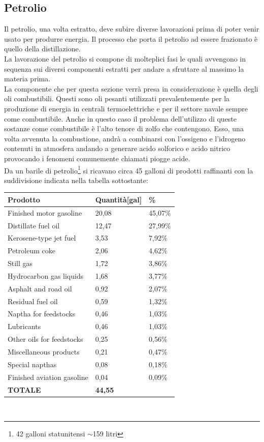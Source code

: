 \subsection{Petrolio}
Il petrolio, una volta estratto, deve subire diverse lavorazioni prima di poter venir usato per produrre energia. Il processo che porta il petrolio ad essere frazionato è quello della distillazione.\\
La lavorazione del petrolio si compone di molteplici fasi le quali avvengono in sequenza sui diversi componenti estratti per andare a sfruttare al massimo la materia prima.\\
La componente che per questa sezione verrà presa in considerazione è quella degli oli combustibili. Questi sono oli pesanti utilizzati prevalentemente per la produzione di energia in centrali termoelettriche e per il settore navale sempre come combustibile.
Anche in questo caso il problema dell'utilizzo di queste sostanze come combustibile è l'alto tenore di zolfo che contengono. Esso, una volta avvenuta la combustione, andrà a combinarsi con l'ossigeno e l'idrogeno contenuti in atmosfera andando a generare acido solforico e acido nitrico provocando i fenomeni comunemente chiamati piogge acide.\\
Da un barile di petrolio\footnote{42 galloni statunitensi $\sim$159 litri} si ricavano circa 45 galloni di prodotti raffinanti con la suddivisione indicata nella tabella sottostante\cite{composizione-petrolio}:\\
\begin{table}[!ht]
    \centering
    \begin{tabular}{|l|l|l|}
    \hline
        \textbf{Prodotto} & \textbf{Quantità[gal]} & \textbf{\%} \\ \hline
        Finished motor gasoline & 20,08 & 45,07\% \\ \hline
        Distillate fuel oil & 12,47 & 27,99\% \\ \hline
        Kerosene-type jet fuel & 3,53 & 7,92\% \\ \hline
        Petroleum coke & 2,06 & 4,62\% \\ \hline
        Still gas & 1,72 & 3,86\% \\ \hline
        Hydrocarbon gas liquids & 1,68 & 3,77\% \\ \hline
        Asphalt and road oil & 0,92 & 2,07\% \\ \hline
        Residual fuel oil & 0,59 & 1,32\% \\ \hline
        Naptha for feedstocks & 0,46 & 1,03\% \\ \hline
        Lubricants & 0,46 & 1,03\% \\ \hline
        Other oils for feedstocks & 0,25 & 0,56\% \\ \hline
        Miscellaneous products & 0,21 & 0,47\% \\ \hline
        Special napthas & 0,08 & 0,18\% \\ \hline
        Finished aviation gasoline & 0,04 & 0,09\% \\ \hline
        \textbf{TOTALE} & \textbf{44,55} & \\ \hline
    \end{tabular}
\end{table}\\
